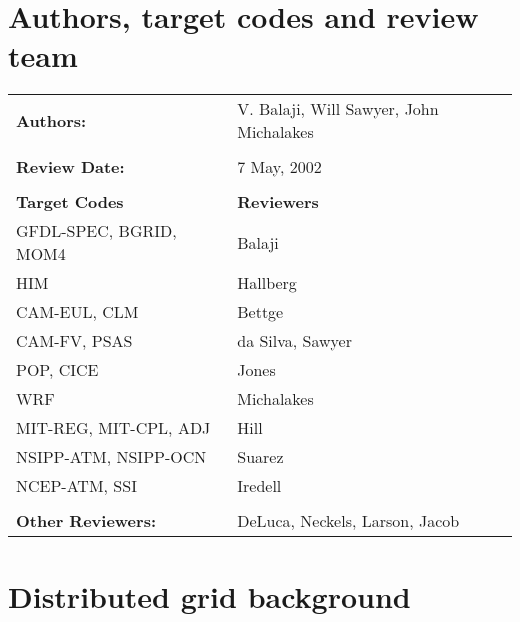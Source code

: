 \section{Authors, target codes and review team}


\begin{tabular}{l l}

{\bf Authors:}  & V. Balaji, Will Sawyer, John Michalakes\\ \\

{\bf Review Date:}            & 7 May, 2002 \\ \\

{\bf Target Codes}            & {\bf Reviewers} \\
GFDL-SPEC, BGRID, MOM4        & Balaji \\ 
HIM                           & Hallberg \\
CAM-EUL, CLM                  & Bettge \\
CAM-FV, PSAS                  & da Silva, Sawyer\\
POP, CICE                     & Jones \\
WRF                           & Michalakes \\
MIT-REG, MIT-CPL, ADJ         & Hill \\
NSIPP-ATM, NSIPP-OCN          & Suarez \\
NCEP-ATM, SSI                 & Iredell \\ \\

{\bf Other Reviewers:}        & DeLuca, Neckels, Larson, Jacob

\end{tabular}


%

\section{Distributed grid background}


